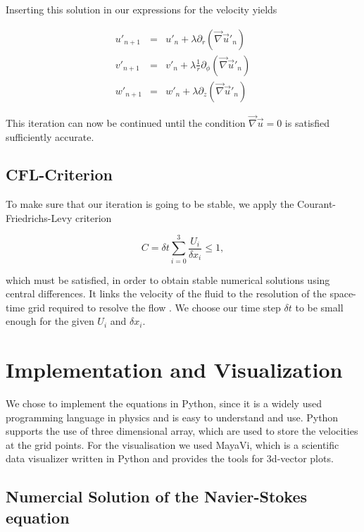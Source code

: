 \documentclass[12pt, a4paper]{article} %
\begin{document}
		Inserting this solution in our expressions for the velocity yields
		
		\begin{eqnarray}
			u'_{n+1} &=& u'_n + \lambda \partial_r (\vec{\nabla}\vec{u}'_n) \\
			v'_{n+1} &=& v'_n + \lambda \frac{1}{r} \partial_\phi (\vec{\nabla}\vec{u}'_n) \\
			w'_{n+1} &=& w'_n + \lambda \partial_z (\vec{\nabla}\vec{u}'_n)
			\label{eq:Drucknachregelung uvw}
		\end{eqnarray}
		
		This iteration can now be continued until the condition $\vec{\nabla}\vec{u}=0$ is satisfied sufficiently accurate. 
	
	\subsection{CFL-Criterion} %
		To make sure that our iteration is going to be stable, we apply the Courant-Friedrichs-Levy criterion
		
		\begin{equation}
			C = \delta t \sum_{i=0}^3 \frac{U_i}{\delta x_i} \leq 1 ,
			\label{eq:CFL}
		\end{equation}
		 
		which must be satisfied, in order to obtain stable numerical solutions using central differences. It links the velocity of the fluid to the resolution of the space-time grid required to resolve the flow \cite{Stocker2009}.
		We choose our time step $\delta t$ to be small enough for the given $U_i$ and $\delta x_i$.
		
		
	\newpage
\section{Implementation and Visualization}

	We chose to implement the equations in Python, since it is a widely used programming language in physics and is easy to understand and use. Python supports the use of three dimensional array, which are used to store the velocities at the grid points. For the visualisation we used MayaVi, which is a scientific data visualizer written in Python and provides the tools for 3d-vector plots.

	\subsection{Numercial Solution of the Navier-Stokes equation}
		
\end{document}
